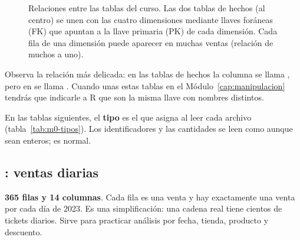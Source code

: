 \begin{figure}[H]
\caption{Relaciones entre las tablas del curso. Las dos tablas de hechos
(al centro) se unen con las cuatro dimensiones mediante llaves foráneas
(FK) que apuntan a la llave primaria (PK) de cada dimensión. Cada fila de
una dimensión puede aparecer en muchas ventas (relación de muchos a uno).}
\label{fig:m0-relaciones}
\end{figure}

Observa la relación más delicada: en las tablas de hechos la columna se
llama , pero en  se llama
. Cuando unas estas tablas en el
Módulo~\ref{cap:manipulacion} tendrás que indicarle a R que son la misma
llave con nombres distintos.

En las tablas siguientes, el \textbf{tipo} es el que asigna
 al leer cada archivo (tabla~\ref{tab:m0-tipos}). Los
identificadores y las cantidades se leen como  aunque sean
enteros; es normal.

\subsection{\texorpdfstring{}{ventas\_retail.csv}:
ventas diarias}

\textbf{365 filas y 14 columnas}. Cada fila es una venta y hay
exactamente una venta por cada día de 2023. Es una simplificación: una
cadena real tiene cientos de tickets diarios. Sirve para practicar
análisis por fecha, tienda, producto y descuento.

